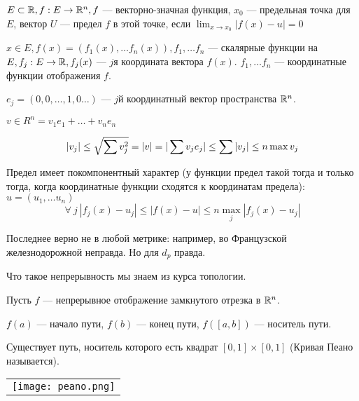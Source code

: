 \documentclass[12pt]{report}
\begin{document}
\begin{defn}
$E \subset \mathbb{R}, f : E \to \mathbb{R}^n, f$ --- векторно-значная функция, $x_0$ --- предельная точка для $E$, вектор $U$ --- предел $f$ в этой точке, если $\lim_{x \to x_0}{|f(x) - u|} = 0$

$x \in E, f(x) = (f_1(x), \dots f_n(x)), f_1, \dots f_n$ --- скалярные функции на $E, f_j: E\to \mathbb{R}, f_j(x)$ --- $j$я координата вектора $f(x)$. $f_1, \dots f_n$ --- координатные функции отображения $f$.

$e_j = (0, 0, \dots, 1, 0\dots)$ --- $j$й координатный вектор пространства $\mathbb{R}^n$.

$v \in R^n = v_1e_1 + \dots + v_ne_n$

$$|v_j| \le \sqrt{\sum\limits{v_j^2}} = |v| = |\sum\limits{v_je_j}| \le \sum\limits{|v_j|} \le n \max{v_j}$$

Предел имеет покомпонентный характер (у функции предел такой тогда и только тогда, когда координатные функции сходятся к координатам предела):
$u = (u_1, \dots u_n)$
$$\forall ~j ~|f_j(x) - u_j| \le |f(x) - u| \le n\max_j|f_j(x) - u_j|$$
\end{defn}

\begin{rem}
Последнее верно не в любой метрике: например, во Французской железнодорожной неправда. Но для $d_p$ правда.
\end{rem}

\begin{rem}
Что такое непрерывность мы знаем из курса топологии.
\end{rem}

\begin{defn}
Пусть $f$ --- непрерывное отображение замкнутого отрезка в $\mathbb{R}^n$.

$f(a)$ --- начало пути, $f(b)$ --- конец пути, $f([a, b])$ --- носитель пути.
\end{defn}

\begin{thm}
Существует путь, носитель которого есть квадрат $[0, 1] \times [0, 1]$ (Кривая Пеано называется).
\end{thm}

\begin{center}
\begin{tabular}{c}
\texttt{[image: peano.png]}\\
\end{tabular}
\end{center}
\end{document}
